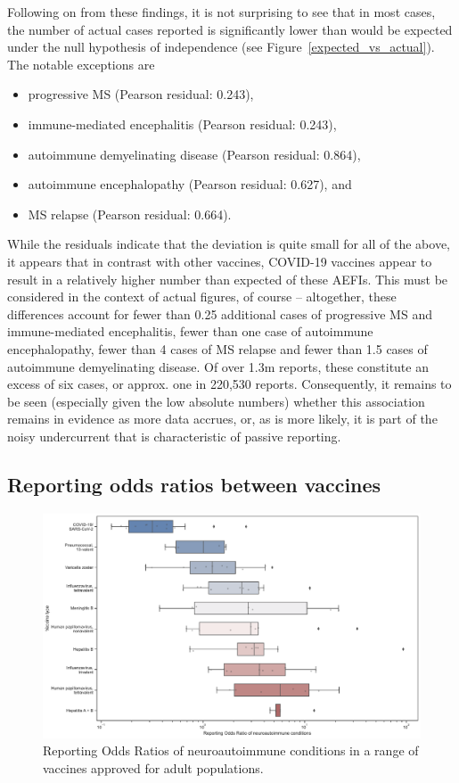 \documentclass[idr,communication,submit,oneauthor,pdftex]{Definitions/mdpi}
\begin{document}
Following on from these findings, it is not surprising to see that in most cases, the number of actual cases reported
is significantly lower than would be expected under the null hypothesis of independence (see
Figure~\ref{expected_vs_actual}). The notable exceptions are

\begin{itemize}
    \item progressive MS (Pearson residual: 0.243),
    \item immune-mediated encephalitis (Pearson residual: 0.243),
    \item autoimmune demyelinating disease (Pearson residual: 0.864),
    \item autoimmune encephalopathy (Pearson residual: 0.627), and
    \item MS relapse (Pearson residual: 0.664).
\end{itemize}

While the residuals indicate that the deviation is quite small for all of the above, it appears that in contrast with
other vaccines, COVID-19 vaccines appear to result in a relatively higher number than expected of these AEFIs. This
must be considered in the context of actual figures, of course – altogether, these differences account for fewer than
0.25 additional cases of progressive MS and immune-mediated encephalitis, fewer than one case of autoimmune
encephalopathy, fewer than 4 cases of MS relapse and fewer than 1.5 cases of autoimmune demyelinating disease. Of over
1.3m reports, these constitute an excess of six cases, or approx. one in 220,530 reports. Consequently, it remains to
be seen (especially given the low absolute numbers) whether this association remains in evidence as more data accrues,
or, as is more likely, it is part of the noisy undercurrent that is characteristic of passive reporting.

\subsection{Reporting odds ratios between vaccines}

\begin{figure}[H]
\includegraphics[width=12.5 cm]{ror_by_vaccine_type}
\caption{Reporting Odds Ratios of neuroautoimmune conditions in a range of vaccines approved for adult populations.
\label{ror_by_vaccine_type}}
\end{figure}
\end{document}
